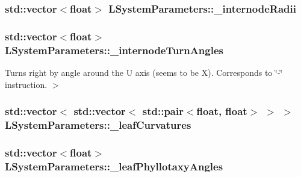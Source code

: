 \hypertarget{classLSystemParameters_aed5693a39acfe7da5f2338a470fa56da}{
\subsubsection[{\-\_\-internode\-Radii}]{\setlength{\rightskip}{0pt plus 5cm}std\-::vector$<$float$>$ L\-System\-Parameters\-::\-\_\-internode\-Radii\hspace{0.3cm}{\ttfamily [private]}}}\label{classLSystemParameters_aed5693a39acfe7da5f2338a470fa56da}
\hypertarget{classLSystemParameters_af078859120313ef883b1ac15dddc8330}{
\subsubsection[{\-\_\-internode\-Turn\-Angles}]{\setlength{\rightskip}{0pt plus 5cm}std\-::vector$<$float$>$ L\-System\-Parameters\-::\-\_\-internode\-Turn\-Angles\hspace{0.3cm}{\ttfamily [private]}}}\label{classLSystemParameters_af078859120313ef883b1ac15dddc8330}


Turns right by angle around the U axis (seems to be X). Corresponds to \char`\"{}-\/\char`\"{} instruction. $>$ 

\hypertarget{classLSystemParameters_a257d10b96cb874d2756013098f8c7095}{
\subsubsection[{\-\_\-leaf\-Curvatures}]{\setlength{\rightskip}{0pt plus 5cm}std\-::vector$<$ std\-::vector$<$ std\-::pair$<$float, float$>$ $>$ $>$ L\-System\-Parameters\-::\-\_\-leaf\-Curvatures\hspace{0.3cm}{\ttfamily [private]}}}\label{classLSystemParameters_a257d10b96cb874d2756013098f8c7095}
\hypertarget{classLSystemParameters_ad34438ab953227fe2810433f2c0fbcd6}{
\subsubsection[{\-\_\-leaf\-Phyllotaxy\-Angles}]{\setlength{\rightskip}{0pt plus 5cm}std\-::vector$<$float$>$ L\-System\-Parameters\-::\-\_\-leaf\-Phyllotaxy\-Angles\hspace{0.3cm}{\ttfamily [private]}}}\label{classLSystemParameters_ad34438ab953227fe2810433f2c0fbcd6}


